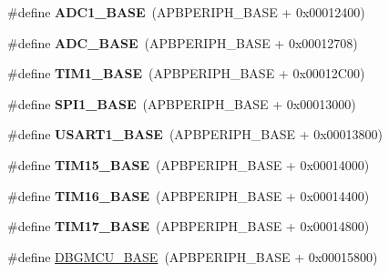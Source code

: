 \begin{DoxyCompactItemize}
\item 
\mbox{\label{group___peripheral__memory__map_ga695c9a2f892363a1c942405c8d351b91}} 
\#define {\bfseries A\+D\+C1\+\_\+\+B\+A\+SE}~(A\+P\+B\+P\+E\+R\+I\+P\+H\+\_\+\+B\+A\+SE + 0x00012400)
\item 
\mbox{\label{group___peripheral__memory__map_gad06cb9e5985bd216a376f26f22303cd6}} 
\#define {\bfseries A\+D\+C\+\_\+\+B\+A\+SE}~(A\+P\+B\+P\+E\+R\+I\+P\+H\+\_\+\+B\+A\+SE + 0x00012708)
\item 
\mbox{\label{group___peripheral__memory__map_gaf8aa324ca5011b8173ab16585ed7324a}} 
\#define {\bfseries T\+I\+M1\+\_\+\+B\+A\+SE}~(A\+P\+B\+P\+E\+R\+I\+P\+H\+\_\+\+B\+A\+SE + 0x00012\+C00)
\item 
\mbox{\label{group___peripheral__memory__map_ga50cd8b47929f18b05efbd0f41253bf8d}} 
\#define {\bfseries S\+P\+I1\+\_\+\+B\+A\+SE}~(A\+P\+B\+P\+E\+R\+I\+P\+H\+\_\+\+B\+A\+SE + 0x00013000)
\item 
\mbox{\label{group___peripheral__memory__map_ga86162ab3f740db9026c1320d46938b4d}} 
\#define {\bfseries U\+S\+A\+R\+T1\+\_\+\+B\+A\+SE}~(A\+P\+B\+P\+E\+R\+I\+P\+H\+\_\+\+B\+A\+SE + 0x00013800)
\item 
\mbox{\label{group___peripheral__memory__map_ga7ab42ce1846930569d742d339b554078}} 
\#define {\bfseries T\+I\+M15\+\_\+\+B\+A\+SE}~(A\+P\+B\+P\+E\+R\+I\+P\+H\+\_\+\+B\+A\+SE + 0x00014000)
\item 
\mbox{\label{group___peripheral__memory__map_ga16c97093a531d763b0794c3e6d09e1bf}} 
\#define {\bfseries T\+I\+M16\+\_\+\+B\+A\+SE}~(A\+P\+B\+P\+E\+R\+I\+P\+H\+\_\+\+B\+A\+SE + 0x00014400)
\item 
\mbox{\label{group___peripheral__memory__map_gaffbedbe30e8c4cffdea326d6c1800574}} 
\#define {\bfseries T\+I\+M17\+\_\+\+B\+A\+SE}~(A\+P\+B\+P\+E\+R\+I\+P\+H\+\_\+\+B\+A\+SE + 0x00014800)
\item 
\#define \hyperlink{group___peripheral__memory__map_ga4adaf4fd82ccc3a538f1f27a70cdbbef}{D\+B\+G\+M\+C\+U\+\_\+\+B\+A\+SE}~(A\+P\+B\+P\+E\+R\+I\+P\+H\+\_\+\+B\+A\+SE + 0x00015800)

\end{DoxyCompactItemize}
